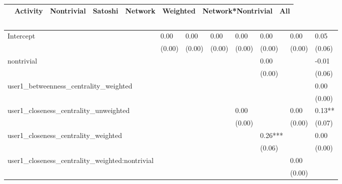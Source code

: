 \begin{table}
\caption{}
\begin{center}
\begin{tabular}{lccccccc}
\hline
                                               & Activity & Nontrivial & Satoshi & Network & Weighted & Network*Nontrivial &   All    \\
\hline
\hline
\end{tabular}
\begin{tabular}{llllllll}
Intercept                                      & 0.00     & 0.00       & 0.00    & 0.00    & 0.00     & 0.00               & 0.05     \\
                                               & (0.00)   & (0.00)     & (0.00)  & (0.00)  & (0.00)   & (0.00)             & (0.06)   \\
nontrivial                                     &          &            &         &         & 0.00     &                    & -0.01    \\
                                               &          &            &         &         & (0.00)   &                    & (0.06)   \\
user1_betweenness_centrality_weighted          &          &            &         &         &          &                    & 0.00     \\
                                               &          &            &         &         &          &                    & (0.00)   \\
user1_closeness_centrality_unweighted          &          &            &         & 0.00    &          & 0.00               & 0.13**   \\
                                               &          &            &         & (0.00)  &          & (0.00)             & (0.07)   \\
user1_closeness_centrality_weighted            &          &            &         &         & 0.26***  &                    & 0.00     \\
                                               &          &            &         &         & (0.06)   &                    & (0.00)   \\
user1_closeness_centrality_weighted:nontrivial &          &            &         &         &          & 0.00               &          \\
                                               &          &            &         &         &          & (0.00)             &          \\

\end{tabular}
\end{center}
\end{table}
